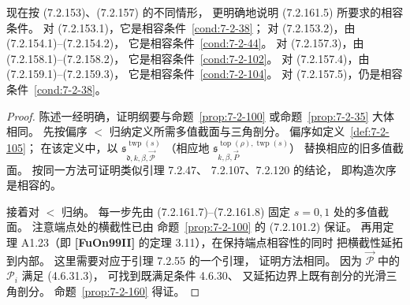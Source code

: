 现在按 (7.2.153)、(7.2.157) 的不同情形，
更明确地说明 (7.2.161.5) 所要求的相容条件。
对 (7.2.153.1)，它是相容条件~\ref{cond:7-2-38}；
对 (7.2.153.2)，由 (7.2.154.1)--(7.2.154.2)，
它是相容条件~\ref{cond:7-2-44}。
对 (7.2.157.3)，由 (7.2.158.1)--(7.2.158.2)，
它是相容条件~\ref{cond:7-2-102}。
对 (7.2.157.4)，由 (7.2.159.1)--(7.2.159.3)，
它是相容条件~\ref{cond:7-2-104}。
对 (7.2.157.5)，仍是相容条件~\ref{cond:7-2-38}。

\begin{proof}
陈述一经明确，证明纲要与命题~\ref{prop:7-2-100}
或命题~\ref{prop:7-2-35} 大体相同。
先按偏序 $<$ 归纳定义所需多值截面与三角剖分。
偏序如定义~\ref{def:7-2-105}；
在该定义中，以
$\mathfrak s_{\mathfrak d,k,\beta,
\vec{\mathcal P}}^{\operatorname{twp}(s)}$
（相应地
$\mathfrak s_{k,\beta,\vec P}^{
\operatorname{top}(\rho),\operatorname{twp}(s)}$）
替换相应的旧多值截面。
按同一方法可证明类似引理 7.2.47、
7.2.107、7.2.120 的结论，
即构造次序是相容的。

接着对 $<$ 归纳。
每一步先由 (7.2.161.7)--(7.2.161.8)
固定 $s=0,1$ 处的多值截面。
注意端点处的横截性已由
命题~\ref{prop:7-2-100} 的 (7.2.101.2) 保证。
再用定理 A1.23（即 \textbf{[FuOn99II]}
的定理 3.11），在保持端点相容性的同时
把横截性延拓到内部。
这里需要对应于引理 7.2.55 的一个引理，
证明方法相同。
因为 $\vec{\mathcal P}$ 中的 $\mathcal P_i$
满足 (4.6.31.3)，
可找到既满足条件 4.6.30、
又延拓边界上既有剖分的光滑三角剖分。
命题~\ref{prop:7-2-160} 得证。
\end{proof}

